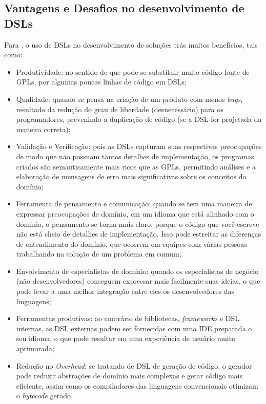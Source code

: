 \subsection{Vantagens e Desafios no desenvolvimento de DSLs}
\label{beneficiosdsl}

Para , o uso de \gls{DSL}s no desenvolvimento de soluções trás muitos benefícios, tais como:

\begin{itemize}
    \item Produtividade: no sentido de que pode-se substituir muito código fonte de \gls{GPL}s, por algumas poucas linhas de código em \gls{DSL}s;
    
    \item Qualidade: quando se pensa na criação de um produto com menos \textit{bugs}, resultado da redução do grau de liberdade (desnecessário) para os programadores, prevenindo a duplicação de código (se a \gls{DSL} for projetada da maneira correta);
    
    \item Validação e Verificação: pois as \gls{DSL}s capturam suas respectivas preocupações de modo que não possuam tantos detalhes de implementação, os programas criados são semanticamente mais ricos que as \gls{GPL}s, permitindo análises e a elaboração de mensagens de erro mais significativas sobre os conceitos do domínio;
    
    \item Ferramenta de pensamento e comunicação: quando se tem uma maneira de expressar preocupações de domínio, em um idioma que está alinhado com o domínio, o pensamento se torna mais claro, porque o código que você escreve não está cheio de detalhes de implementação. Isso pode estreitar as diferenças de entendimento do domínio, que ocorrem em equipes com várias pessoas trabalhando na solução de um problema em comum;
    
    \item Envolvimento de especialistas de domínio: quando os especialistas de negócio (não desenvolvedores) conseguem expressar mais facilmente suas ideias, o que pode levar a uma melhor integração entre eles os desenvolvedores das linguagens;
    
    \item Ferramentas produtivas: ao contrário de bibliotecas, \textit{frameworks} e \gls{DSL} internas, as \gls{DSL} externas podem ser fornecidas com uma \gls{IDE} preparada o seu idioma, o que pode resultar em uma experiência de usuário muito aprimorada;

    \item Redução no \textit{Overhead}: se tratando de \gls{DSL} de geração de código, o gerador pode reduzir abstrações de domínio mais complexas e gerar código mais eficiente, assim como os compiladores das linguagens convencionais otimizam o \textit{bytecode} gerado.
\end{itemize}

